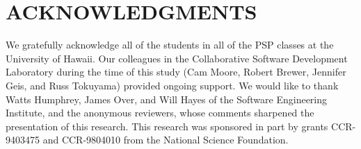 \section{ACKNOWLEDGMENTS}

We gratefully acknowledge all of the students in all of the PSP classes at
the University of Hawaii.  Our colleagues in the Collaborative Software
Development Laboratory during the time of this study (Cam Moore, Robert
Brewer, Jennifer Geis, and Russ Tokuyama) provided ongoing support.  We
would like to thank Watts Humphrey, James Over, and Will Hayes of the
Software Engineering Institute, and the anonymous reviewers, whose comments
sharpened the presentation of this research.  This research was sponsored
in part by grants CCR-9403475 and CCR-9804010 from the National Science
Foundation.

